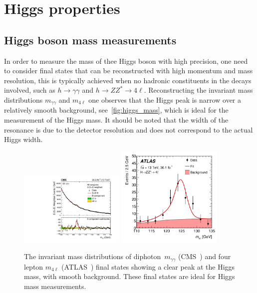 \section{Higgs properties \label{sec:Higgsprop} }
\subsection{Higgs boson mass measurements}
In order to measure the mass of thee Higgs boson with high precision, one need to consider final states that can be reconstructed with high momentum and mass resolution, this is typically achieved when no hadronic constituents in the decays involved, such as  $ h \to \gamma \gamma$ and $ h \to Z Z^*\to 4 \ell$. Reconstructing the invariant mass distributions $m_{\gamma \gamma}$ and $m_{4\ell}$ one observes that the Higgs peak is narrow over a relatively smooth background, see~\autoref{fig:higgs_mass}, which is ideal for the measurement of the Higgs mass. It should be noted that the width of the resonance is due to the detector resolution and does not correspond to the actual Higgs width.\\
\begin{figure}[t!]
	\begin{center}
		\includegraphics[width=0.45\textwidth]{figures/Higgs_results/CMS-HIG-19-004_Figure_005-b}
		\includegraphics[width=0.45\textwidth]{figures/Higgs_results/dataAll_H4l_m4l_pdf_constrained} 
		\caption{The invariant mass distributions of diphoton~$m_{\gamma \gamma}$ (CMS~\cite{CMS:2020xrn}) and four lepton $m_{4 \ell}$ (ATLAS~\cite{ATLAS:2018tdk}) final states showing a clear peak at the Higgs mass, with smooth background. These final states are ideal for Higgs mass measurements. \label{fig:higgs_mass} }
	\end{center}
\end{figure}
